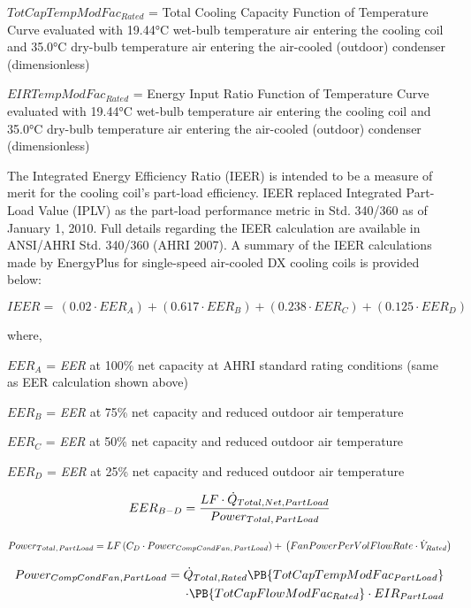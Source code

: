 \(TotCapTempModFa{c_{Rated}}\) = Total Cooling Capacity Function of Temperature Curve evaluated with 19.44°C wet-bulb temperature air entering the cooling coil and 35.0°C dry-bulb temperature air entering the air-cooled (outdoor) condenser (dimensionless)

\(EIRTempModFa{c_{Rated}}\) = Energy Input Ratio Function of Temperature Curve evaluated with 19.44°C wet-bulb temperature air entering the cooling coil and 35.0°C dry-bulb temperature air entering the air-cooled (outdoor) condenser (dimensionless)

The Integrated Energy Efficiency Ratio (IEER) is intended to be a measure of merit for the cooling coil's part-load efficiency. IEER replaced Integrated Part-Load Value (IPLV) as the part-load performance metric in Std. 340/360 as of January 1, 2010. Full details regarding the IEER calculation are available in ANSI/AHRI Std. 340/360 (AHRI 2007). A summary of the IEER calculations made by EnergyPlus for single-speed air-cooled DX cooling coils is provided below:

\begin{equation}
IEER = \,(0.02 \cdot EE{R_A}) + (0.617 \cdot EE{R_B}) + (0.238 \cdot EE{R_C}) + (0.125 \cdot EE{R_D})
\end{equation}

where,

\(EE{R_A}\) = \emph{EER} at 100\% net capacity at AHRI standard rating conditions (same as EER calculation shown above)

\(EE{R_B}\) = \emph{EER} at 75\% net capacity and reduced outdoor air temperature

\(EE{R_C}\) = \emph{EER} at 50\% net capacity and reduced outdoor air temperature

\(EE{R_D}\) = \emph{EER} at 25\% net capacity and reduced outdoor air temperature

\begin{equation}
EE{R_{B - D}} = \frac{{LF \cdot {{\dot Q}_{Total,Net,PartLoad}}}}{{Powe{r_{Total,{\kern 1pt} PartLoad}}}}
\end{equation}

\begin{equation}
Powe{r_{Total,{\kern 1pt} PartLoad}} = LF\left( {{C_D} \cdot Powe{r_{CompCondFan,{\kern 1pt} PartLoad}}} \right) + \,\left( {FanPowerPerVolFlowRate \cdot {{\dot V}_{Rated}}} \right)
\end{equation}

\begin{equation}
\begin{split}
Power_{CompCondFan,PartLoad} = \dot{Q}_{Total,Rated}\PB{TotCapTempModFac_{PartLoad}} \\ 
\cdot \PB{TotCapFlowModFac_{Rated}} \cdot EIR_{PartLoad}
\end{split}
\end{equation}

